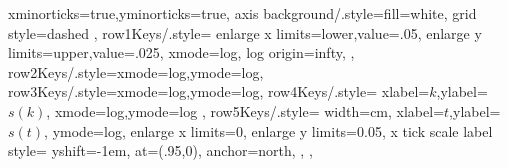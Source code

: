 {{{                            xminorticks=true,yminorticks=true,
                            axis background/.style={fill=white},
                            grid style={dashed}
                        },
                        row1Keys/.style={
                            enlarge x limits={lower,value=.05},
                            enlarge y limits={upper,value=.025},
                            xmode=log,
                            log origin=infty,
                        },
                        row2Keys/.style={xmode=log,ymode=log},
                        row3Keys/.style={xmode=log,ymode=log},
                        row4Keys/.style={
                            xlabel={\(k\)},ylabel={\(s(k)\)},
                            xmode=log,ymode=log
                        },
                        row5Keys/.style={
                            width=\plotLastWidth cm,
                            xlabel={\(t\)},ylabel={\(s(t)\)},
                            ymode=log,
                            enlarge x limits=0,
                            enlarge y limits=0.05,
                            x tick scale label style={
                                yshift=-1em,
                                at={(.95,0)},
                                anchor=north,
                            },
                        },
                    }
            }
    
